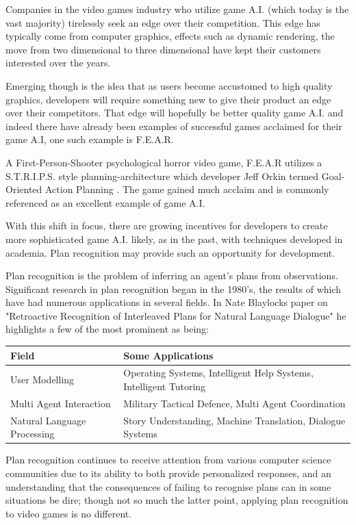 \documentclass[parskip]{cs4rep}
\begin{document}
Companies in the video games industry who utilize game A.I. (which today is the vast majority) tirelessly seek an edge over their competition. This edge has typically come from computer graphics, effects such as dynamic rendering, the move from two dimensional to three dimensional have kept their customers interested over the years. 

Emerging though is the idea that as users become accustomed to high quality graphics, developers will require something new to give their product an edge over their competitors. That edge will hopefully be better quality game A.I. and indeed there have already been examples of successful games acclaimed for their game A.I, one such example is F.E.A.R. 

A First-Person-Shooter psychological horror video game, F.E.A.R utilizes a S.T.R.I.P.S. style planning-architecture which developer Jeff Orkin termed Goal-Oriented Action Planning \cite{citeulike:5386647}. The game gained much acclaim and is commonly referenced as an excellent example of game A.I.

With this shift in focus, there are growing incentives for developers to create more sophisticated game A.I. likely, as in the past, with techniques developed in academia. Plan recognition may provide such an opportunity for development. 

Plan recognition is the problem of inferring an agent's plans from observations. Significant research in plan recognition began in the 1980's, the results of which have had numerous applications in several fields. In Nate Blaylocks paper on "Retroactive Recognition of Interleaved Plans for Natural Language Dialogue" \cite{oai:CiteSeerPSU:538953} he highlights a few of the most prominent as being:

\begin{tabular}{|l|p{8cm}|}
\hline 
\textbf{Field} & \textbf{Some Applications} \\ 
\hline 
User Modelling & Operating Systems, Intelligent Help Systems, Intelligent Tutoring \\ 
\hline 
Multi Agent Interaction & Military Tactical Defence, Multi Agent Coordination \\ 
\hline 
Natural Language Processing & Story Understanding, Machine Translation, Dialogue Systems \\ 
\hline
\end{tabular} 

Plan recognition continues to receive attention from various computer science communities due to its ability to both provide personalized responses, and an understanding that the consequences of failing to recognise plans can in some situations be dire; though not so much the latter point, applying plan recognition to video games is no different.
\end{document}
